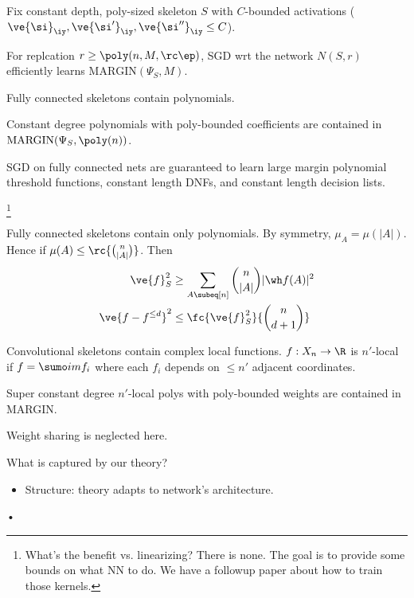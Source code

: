 Fix constant depth, poly-sized skeleton $S$ with $C$-bounded activations ($\ve{\si}_{\iy}, \ve{\si'}_{\iy}, \ve{\si''}_{\iy}\le C$). 

\begin{thm}
For replcation $r\ge \poly(n,M,\rc \ep)$, SGD wrt the network $N(S,r)$ efficiently learns $\text{MARGIN}(\Psi_S,M)$.
\end{thm}


Fully connected skeletons contain polynomials.
\begin{fct}
Constant degree polynomials with poly-bounded coefficients are contained in $\text{MARGIN}(\Psi_S, \poly(n))$. 
\end{fct}
\begin{cor}
SGD on fully connected nets are guaranteed to learn large margin polynomial threshold functions, constant length DNFs, and constant length decision lists.
\end{cor}
\footnote{What's the benefit vs. linearizing? There is none. The goal is to provide some bounds on what NN to do. We have a followup paper about how to train those kernels.}

Fully connected skeletons contain only polynomials. By symmetry, $\mu_A=\mu(|A|)$. Hence if $\mu(A) \le \rc{\binom n{|A|}}$. Then
\begin{align}
\ve{f}_S^2 &\ge \sum_{A\subeq [n]}\binom n{|A|}|\wh f(A)|^2\\
\ve{f-f^{\le d}}^2&\le \fc{\ve{f}_S^2}{\binom n{d+1}}
\end{align}

Convolutional skeletons contain complex local functions. $f:X_n \to \R$ is $n'$-local if $f=\sumo im f_i$ where each $f_i$ depends on $\le n'$ adjacent coordinates.

Super constant degree $n'$-local polys with poly-bounded weights are contained in MARGIN. %

Weight sharing is neglected here.

What is captured by our theory? 
\begin{itemize}
\item
Structure: theory adapts to network's architecture.
\end{itemize}•


